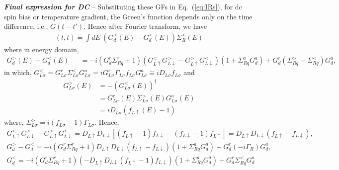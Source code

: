 \documentclass[aps,prb,superscriptaddress]{revtex4-2}
\begin{document}
{\noindent \textbf{\textit{Final expression for DC}}} -- Substituting these GFs in Eq.~(\ref{eq:IRs}), for dc spin bias or temperature gradient, the Green's function depends only on the time difference, i.e., $G(t-t')$. Hence after Fourier transform, we have
\begin{eqnarray}
[(G_{d}^>- G_{d}^<)\Sigma^<_R](t,t)=\int dE ~ (G_{d}^>(E)- G_{d}^<(E))\Sigma^<_R(E) \nonumber
\end{eqnarray}
where in energy domain,
\begin{eqnarray}
G_{d}^>(E)- G_{d}^<(E)&&= -i(G^r_{d}\Sigma^r_{Rq} +1) (G^<_{L\uparrow}G^>_{L\downarrow} -G^>_{L\uparrow} G^<_{L\downarrow}) (1+ \Sigma^a_{Rq} G^a_{d}) + G^r_{d} (\Sigma^>_{Rq}-\Sigma^<_{Rq}) G^a_{d},
   \label{inter1}
\end{eqnarray}
in which, $G^<_{L\sigma}=G^r_{L\sigma}\Sigma_{L\sigma}^{<}G^a_{L\sigma} = i G^r_{L\sigma}\Gamma_{L\sigma}f_{L\sigma}  G^a_{L\sigma} \equiv iD_{L\sigma}f_{L\sigma}$ and 
\begin{equation}
\begin{split}
G_{L\sigma}^{>}(E) &= -(G_{L\sigma}^{<}(E))^{\dag} \\
&= G_{L\sigma}^{r}(E)\Sigma_{L\sigma}^{>}(E) G_{L\sigma}^{a}(E)\\
&=iD_{L\sigma}(f_{L\uparrow}(E) - 1)
\end{split}
\end{equation}
where, $\Sigma_{L\sigma}^{>} = i(f_{L\sigma}-1)\Gamma_{L\sigma}$. Hence,
\begin{gather}
G_{L\uparrow}^{<} G_{L\downarrow}^{>} - G_{L\uparrow}^{>} G_{L\downarrow}^{<} = D_{L\uparrow}D_{L\downarrow} [(f_{L\uparrow}-1)f_{L\downarrow} - (f_{L\downarrow}-1) f_{L\uparrow}] = D_{L\uparrow}D_{L\downarrow} (f_{L\uparrow} - f_{L\downarrow}), \\
G_{d}^>- G_{d}^<= -i(G^r_{d}\Sigma^r_{Rq} +1) D_{L\uparrow}D_{L\downarrow} (f_{L\uparrow} - f_{L\downarrow}) (1+ \Sigma^a_{Rq} G^a_{d}) + G^r_{d} (-i\Gamma_R) G^a_{d},\label{G><}\\
G_{d}^< =-i(G^r_{d}\Sigma^r_{Rq} +1 ) (-D_{L\uparrow}D_{L\downarrow}(f_{L\uparrow}-1)f_{L\downarrow}) (1+ \Sigma^a_{Rq} G^a_{d}) + G^r_{d} \Sigma^<_{Rq} G^a_{d} \label{Gless}
\end{gather}
\end{document}
